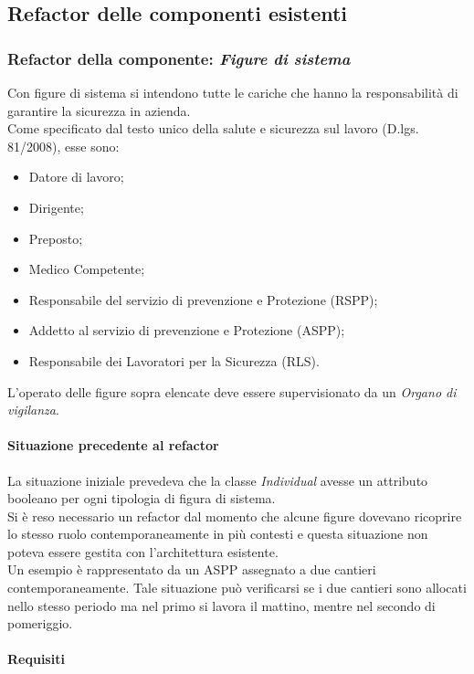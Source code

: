 \subsection{Refactor delle componenti esistenti}
	
	
\subsubsection{Refactor della componente: \textit{Figure di sistema}}
	Con figure di sistema si intendono tutte le cariche che hanno la responsabilità di garantire la sicurezza in azienda. \\
	Come specificato dal testo unico della salute e sicurezza sul lavoro (D.lgs. 81/2008), esse sono: 
	\begin{itemize}
		\item Datore di lavoro;
		\item Dirigente;
		\item Preposto;
		\item Medico Competente;
		\item Responsabile del servizio di prevenzione e Protezione (RSPP);
		\item Addetto al servizio di prevenzione e Protezione (ASPP);
		\item Responsabile dei Lavoratori per la Sicurezza (RLS).
	\end{itemize}
	L'operato delle figure sopra elencate deve essere supervisionato da un \textit{Organo di vigilanza}.

	\paragraph*{Situazione precedente al refactor} 
	
	La situazione iniziale prevedeva che la classe \textit{Individual} avesse  un attributo booleano per ogni tipologia di figura di sistema. \\
	Si è reso necessario un refactor dal momento che alcune figure dovevano ricoprire lo stesso ruolo contemporaneamente in più contesti e questa situazione non poteva essere gestita con l'architettura esistente. \\
	Un esempio è rappresentato da un ASPP assegnato a due cantieri contemporaneamente. Tale situazione può verificarsi se i due cantieri sono allocati nello stesso periodo ma nel primo si lavora il mattino, mentre nel secondo di pomeriggio.\\
	
	\paragraph*{Requisiti}
		
